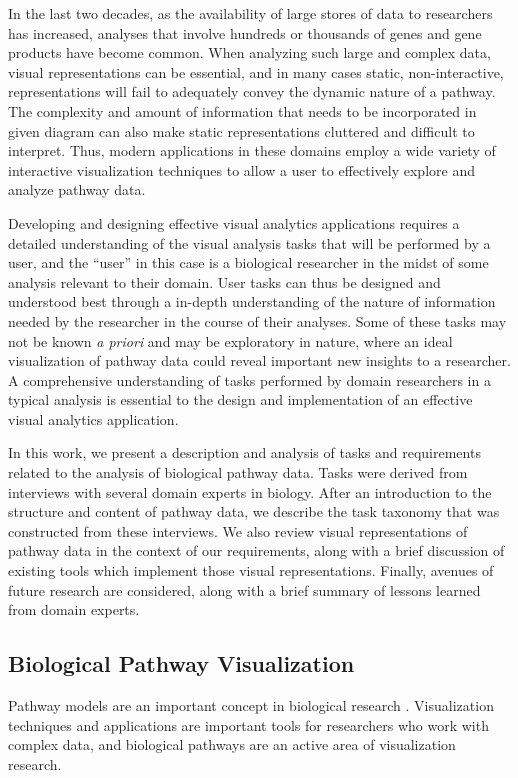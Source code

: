 In the last two decades, as the availability of large stores of data to researchers has increased, analyses that involve hundreds or thousands of genes and gene products have become common.
When analyzing such large and complex data, visual representations can be essential, and in many cases static, non-interactive, representations will fail to adequately convey the dynamic nature of a pathway.
The complexity and amount of information that needs to be incorporated in given diagram can also make static representations cluttered and difficult to interpret.
Thus, modern applications in these domains employ a wide variety of interactive visualization techniques to allow a user to effectively explore and analyze pathway data.

Developing and designing effective visual analytics applications requires a detailed understanding of the visual analysis tasks that will be performed by a user, and the ``user'' in this case is a biological researcher in the midst of some analysis relevant to their domain.
User tasks can thus be designed and understood best through a in-depth understanding of the nature of information needed by the researcher in the course of their analyses.
Some of these tasks may not be known \emph{a priori} and may be exploratory in nature, where an ideal visualization of pathway data could reveal important new insights to a researcher.
A comprehensive understanding of tasks performed by domain researchers in a typical analysis is essential to the design and implementation of an effective visual analytics application.

In this work, we present a description and analysis of tasks and requirements related to the analysis of biological pathway data.
Tasks were derived from interviews with several domain experts in biology.
After an introduction to the structure and content of pathway data, we describe the task taxonomy that was constructed from these interviews.
We also review visual representations of pathway data in the context of our requirements, along with a brief discussion of existing tools which implement those visual representations.
Finally, avenues of future research are considered, along with a brief summary of lessons learned from domain experts.

\subsection*{Biological Pathway Visualization}

Pathway models are an important concept in biological research \cite{cairns2011regulation, luo2003targeting, reya2001stem}.
Visualization techniques and applications are important tools for researchers who work with complex data, and biological pathways are an active area of visualization research.

